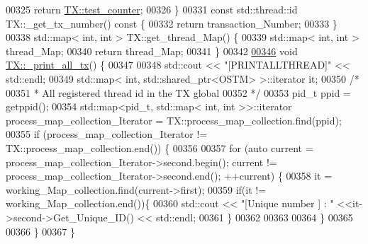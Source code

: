 \begin{DoxyCode}
00325     \textcolor{keywordflow}{return} \hyperlink{class_t_x_a25838234aab99ae891a90eb8623a8b3c}{TX::test\_counter};
00326 \}
00331 \textcolor{keyword}{const} std::thread::id TX::\_get\_tx\_number()\textcolor{keyword}{ const }\{
00332     \textcolor{keywordflow}{return} transaction\_Number;
00333 \}
00338 std::map< int, int > TX::get\_thread\_Map() \{
00339     std::map< int, int > thread\_Map;
00340     \textcolor{keywordflow}{return} thread\_Map;
00341 \}
00342 
\hypertarget{_t_x_8cpp_source.tex_l00346}{}\hyperlink{class_t_x_a3d96ed91eb9ec73e16589f705661c5a7}{00346} \textcolor{keywordtype}{void} \hyperlink{class_t_x_a3d96ed91eb9ec73e16589f705661c5a7}{TX::\_print\_all\_tx}() \{
00347 
00348     std::cout << \textcolor{stringliteral}{"[PRINTALLTHREAD]"} << std::endl;
00349     std::map< int, std::shared\_ptr<OSTM> >::iterator it;
00350     \textcolor{comment}{/*}
00351 \textcolor{comment}{     * All registered thread id in the TX global }
00352 \textcolor{comment}{     */}
00353      pid\_t ppid = getppid();
00354     std::map<pid\_t, std::map< int, int >>::iterator process\_map\_collection\_Iterator = 
      TX::process\_map\_collection.find(ppid);
00355     \textcolor{keywordflow}{if} (process\_map\_collection\_Iterator != TX::process\_map\_collection.end()) \{
00356 
00357         \textcolor{keywordflow}{for} (\textcolor{keyword}{auto} current = process\_map\_collection\_Iterator->second.begin(); current != 
      process\_map\_collection\_Iterator->second.end(); ++current) \{
00358             it = working\_Map\_collection.find(current->first);
00359             \textcolor{keywordflow}{if}(it != working\_Map\_collection.end())\{
00360                 std::cout << \textcolor{stringliteral}{"[Unique number ] : "} <<it->second->Get\_Unique\_ID() << std::endl;
00361             \}
00362 
00363             
00364         \}
00365      
00366     \}
00367 \}
\end{DoxyCode}
